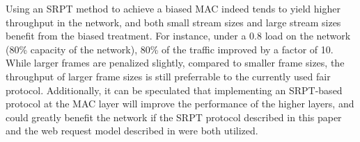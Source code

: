 \documentclass{sigcomm-alternate}
\begin{document}
Using an SRPT method to achieve a biased MAC indeed tends to yield higher throughput in the network, and both small stream sizes and large stream sizes benefit from the biased treatment. For instance, under a 0.8 load on the network (80\% capacity of the network), 80\% of the traffic improved by a factor of 10. While larger frames are penalized slightly, compared to smaller frame sizes, the throughput of larger frame sizes is still preferrable to the currently used fair protocol. Additionally, it can be speculated that implementing an SRPT-based protocol at the MAC layer will improve the performance of the higher layers, and could greatly benefit the network if the SRPT protocol described in this paper and the web request model described in \cite{Unfair} were both utilized.  





\balancecolumns
\end{document}
